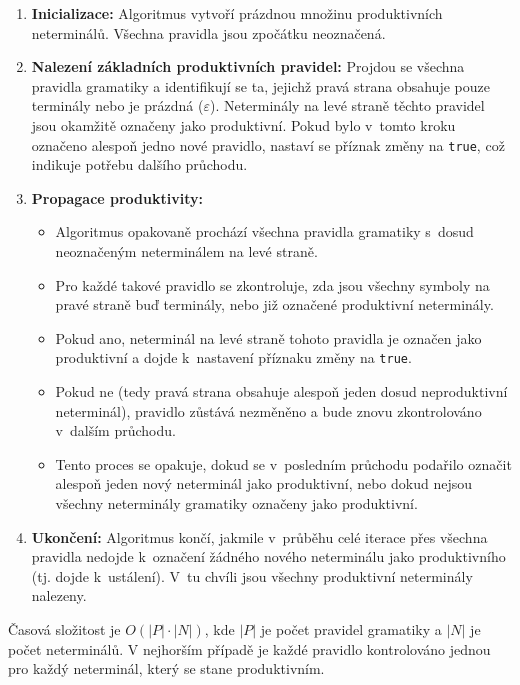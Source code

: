 \begin{enumerate}
    \item \textbf{Inicializace:} Algoritmus vytvoří prázdnou množinu produktivních neterminálů. Všechna pravidla jsou zpočátku neoznačená.
    
    \item \textbf{Nalezení základních produktivních pravidel:} Projdou se všechna pravidla gramatiky a identifikují se ta, jejichž pravá strana obsahuje pouze terminály nebo je prázdná ($\varepsilon$). Neterminály na levé straně těchto pravidel jsou okamžitě označeny jako produktivní. Pokud bylo v~tomto kroku označeno alespoň jedno nové pravidlo, nastaví se příznak změny na \texttt{true}, což indikuje potřebu dalšího průchodu.
    
    \item \textbf{Propagace produktivity:}
    \begin{itemize}
        \item Algoritmus opakovaně prochází všechna pravidla gramatiky s~dosud neoznačeným neterminálem na levé straně.
        \item Pro každé takové pravidlo se zkontroluje, zda jsou všechny symboly na pravé straně buď terminály, nebo již označené produktivní neterminály.
        \item Pokud ano, neterminál na levé straně tohoto pravidla je označen jako produktivní a dojde k~nastavení příznaku změny na \texttt{true}.
        \item Pokud ne (tedy pravá strana obsahuje alespoň jeden dosud neproduktivní neterminál), pravidlo zůstává nezměněno a bude znovu zkontrolováno v~dalším průchodu.
        \item Tento proces se opakuje, dokud se v~posledním průchodu podařilo označit alespoň jeden nový neterminál jako produktivní, nebo dokud nejsou všechny neterminály gramatiky označeny jako produktivní.
    \end{itemize}
    
    \item \textbf{Ukončení:} Algoritmus končí, jakmile v~průběhu celé iterace přes všechna pravidla nedojde k~označení žádného nového neterminálu jako produktivního (tj. dojde k~ustálení). V~tu chvíli jsou všechny produktivní neterminály nalezeny.
\end{enumerate}

Časová složitost je \( O(|P| \cdot |N|) \), kde \( |P| \) je počet pravidel gramatiky a \( |N| \) je počet neterminálů. V nejhorším případě je každé pravidlo kontrolováno jednou pro každý neterminál, který se stane produktivním.

